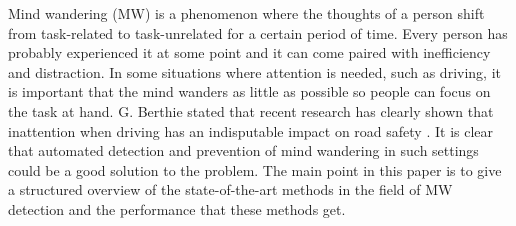 Mind wandering (MW) is a phenomenon where the thoughts of a person shift from task-related to task-unrelated for a certain period of time. Every person has probably experienced it at some point and it can come paired with inefficiency and distraction. In some situations where attention is needed, such as driving, it is important that the mind wanders as little as possible so people can focus on the task at hand. G. Berthie stated that recent research has clearly shown that inattention when driving has an indisputable impact on road safety \cite{berthie2015restless}. It is clear that automated detection and prevention of mind wandering in such settings could be a good solution to the problem. The main point in this paper is to give a structured overview of the state-of-the-art methods in the field of MW detection and the performance that these methods get.